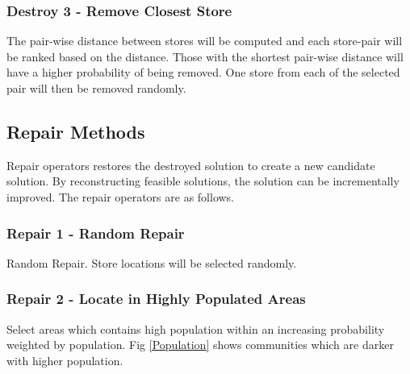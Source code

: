 \documentclass{ecai}
\begin{document}
\subsubsection{Destroy 3 - Remove Closest Store}
The pair-wise distance between stores will be computed and each store-pair will be ranked based on the distance. Those with the shortest pair-wise distance will have a higher probability of being removed.  One store from each of the selected pair will then be removed randomly. 


\subsection{Repair Methods}
Repair operators restores the destroyed solution to create a new candidate solution. By reconstructing feasible solutions, the solution can be incrementally improved. The repair operators are as follows.

\subsubsection{Repair 1 - Random Repair}
Random Repair. Store locations will be selected randomly.

\subsubsection{Repair 2 - Locate in Highly Populated Areas}
Select areas which contains high population within an increasing probability weighted by population. Fig \ref{Population} shows communities which are darker with higher population.

\end{document}
